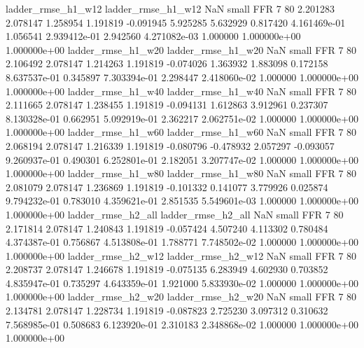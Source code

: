       ladder_rmse_h1_w12       ladder_rmse_h1_w12                   NaN      small      FFR                 7 80 2.201283       2.078147 1.258954       1.191819   -0.091945      5.925285      5.632929     0.817420   4.161469e-01  1.056541 2.939412e-01     2.942560   4.271082e-03            1.000000    1.000000e+00        1.000000e+00
      ladder_rmse_h1_w20       ladder_rmse_h1_w20                   NaN      small      FFR                 7 80 2.106492       2.078147 1.214263       1.191819   -0.074026      1.363932      1.883098     0.172158   8.637537e-01  0.345897 7.303394e-01     2.298447   2.418060e-02            1.000000    1.000000e+00        1.000000e+00
      ladder_rmse_h1_w40       ladder_rmse_h1_w40                   NaN      small      FFR                 7 80 2.111665       2.078147 1.238455       1.191819   -0.094131      1.612863      3.912961     0.237307   8.130328e-01  0.662951 5.092919e-01     2.362217   2.062751e-02            1.000000    1.000000e+00        1.000000e+00
      ladder_rmse_h1_w60       ladder_rmse_h1_w60                   NaN      small      FFR                 7 80 2.068194       2.078147 1.216339       1.191819   -0.080796     -0.478932      2.057297    -0.093057   9.260937e-01  0.490301 6.252801e-01     2.182051   3.207747e-02            1.000000    1.000000e+00        1.000000e+00
      ladder_rmse_h1_w80       ladder_rmse_h1_w80                   NaN      small      FFR                 7 80 2.081079       2.078147 1.236869       1.191819   -0.101332      0.141077      3.779926     0.025874   9.794232e-01  0.783010 4.359621e-01     2.851535   5.549601e-03            1.000000    1.000000e+00        1.000000e+00
      ladder_rmse_h2_all       ladder_rmse_h2_all                   NaN      small      FFR                 7 80 2.171814       2.078147 1.240843       1.191819   -0.057424      4.507240      4.113302     0.780484   4.374387e-01  0.756867 4.513808e-01     1.788771   7.748502e-02            1.000000    1.000000e+00        1.000000e+00
      ladder_rmse_h2_w12       ladder_rmse_h2_w12                   NaN      small      FFR                 7 80 2.208737       2.078147 1.246678       1.191819   -0.075135      6.283949      4.602930     0.703852   4.835947e-01  0.735297 4.643359e-01     1.921000   5.833930e-02            1.000000    1.000000e+00        1.000000e+00
      ladder_rmse_h2_w20       ladder_rmse_h2_w20                   NaN      small      FFR                 7 80 2.134781       2.078147 1.228734       1.191819   -0.087823      2.725230      3.097312     0.310632   7.568985e-01  0.508683 6.123920e-01     2.310183   2.348868e-02            1.000000    1.000000e+00        1.000000e+00
